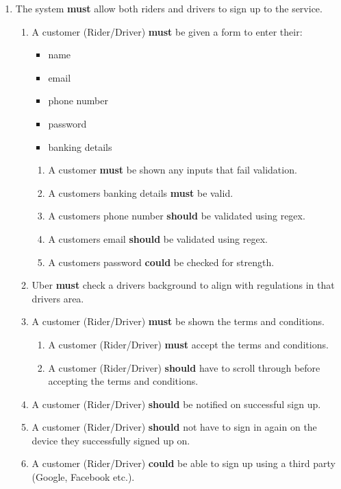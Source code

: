 \documentclass{article}
\begin{document}
\begin{enumerate}
      \vspace{.5cm}
      \item The system \textbf{must} allow both riders and drivers to sign up to the service.
      \begin{enumerate}[label=3.\arabic{*}]
        \item A customer (Rider/Driver) \textbf{must} be given a form to enter their:
        \begin{itemize}
          \item name
          \item email
          \item phone number
          \item password
          \item banking details
        \end{itemize}
        \begin{enumerate}[label=3.1.\arabic{*}]
          \item A customer \textbf{must} be shown any inputs that fail validation.
          \item A customers banking details \textbf{must} be valid.
          \item A customers phone number \textbf{should} be validated using regex.
          \item A customers email \textbf{should} be validated using regex.
          \item A customers password \textbf{could} be checked for strength.
        \end{enumerate}
        \item Uber \textbf{must} check a drivers background to align with regulations in that drivers area.
        \item A customer (Rider/Driver) \textbf{must} be shown the terms and conditions.
        \begin{enumerate}[label=3.3.\arabic{*}]
          \item A customer (Rider/Driver) \textbf{must} accept the terms and conditions.
          \item A customer (Rider/Driver) \textbf{should} have to scroll through before accepting the terms and conditions.
        \end{enumerate}
        \item A customer (Rider/Driver) \textbf{should} be notified on successful sign up.
        \item A customer (Rider/Driver) \textbf{should} not have to sign in again on the device they successfully signed up on.
        \item A customer (Rider/Driver) \textbf{could} be able to sign up using a third party (Google, Facebook etc.).
      \end{enumerate}


\end{enumerate}
\end{document}
